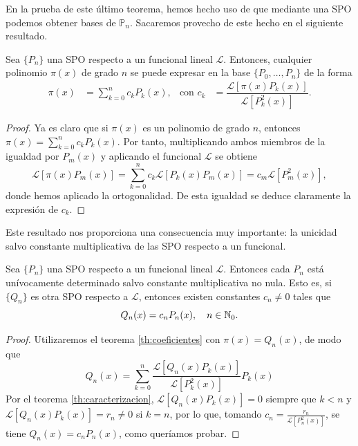 En la prueba de este último teorema, hemos hecho uso de que mediante una SPO podemos obtener bases de $\mathbb P_n$. Sacaremos provecho de este hecho en el siguiente resultado.

\begin{teorema}
    \label{th:coeficientes}
    Sea $\{P_n\}$ una SPO respecto a un funcional lineal $\mathcal{L}$. Entonces, cualquier polinomio $\pi(x)$ de grado $n$ se puede expresar en la base $\{P_0,\dots,P_n\}$ de la forma
    \begin{align*}
        \pi(x)&=\sum_{k=0}^n c_k P_k(x), & \text{con } c_k&= \dfrac{\mathcal{L}[\pi(x)P_k(x)]}{\mathcal{L}[P_k^2(x)]}. 
    \end{align*}
\end{teorema}
\begin{proof}
    Ya es claro que si $\pi(x)$ es un polinomio de grado $n$, entonces $\pi(x)=\sum_{k=0}^n c_k P_k(x)$. Por tanto, multiplicando ambos miembros de la igualdad por $P_m(x)$ y aplicando el funcional $\mathcal{L}$ se obtiene
    $$
    \mathcal{L}[\pi(x)P_m(x)]=\sum_{k=0}^n c_k \mathcal{L}[P_k(x)P_m(x)]=c_m \mathcal{L}[P_m^2(x)], 
    $$
    donde hemos aplicado la ortogonalidad. De esta igualdad se deduce claramente la expresión de $c_k$.

\end{proof}

Este resultado nos proporciona una consecuencia muy importante: la unicidad salvo constante multiplicativa de las SPO respecto a un funcional.

\begin{corolario}
    \label{cor:unicidad-salvo-cte}
    Sea $\{P_n\}$ una SPO respecto a un funcional lineal $\mathcal{L}$. Entonces cada $P_n$ está unívocamente determinado salvo constante multiplicativa no nula. Esto es, si $\{Q_n\}$ es otra SPO respecto a $\mathcal{L}$, entonces existen constantes $c_n\not=0$ tales que
    $$
    Q_n(x)=c_n P_n(x), \ \ \ n\in\N_0.
    $$
\end{corolario}
\begin{proof}
    Utilizaremos el teorema \ref{th:coeficientes} con $\pi(x)=Q_n(x)$, de modo que
    \begin{equation*}
        Q_n(x) = \sum_{k=0}^n \dfrac{\mathcal{L}[Q_n(x)P_k(x)]}{\mathcal{L}[P_k^2(x)]} P_k(x)
    \end{equation*}
    Por el teorema \ref{th:caracterizacion}, $\mathcal{L}[Q_n(x)P_k(x)]=0$ siempre que $k<n$ y $\mathcal{L}[Q_n(x)P_k(x)]=r_n\not=0$ si $k=n$, por lo que, tomando $c_n = \frac{r_n}{\mathcal{L}[P^2_n(x)]}$, se tiene $Q_n(x) = c_n P_n(x)$, como queríamos probar.
\end{proof}


